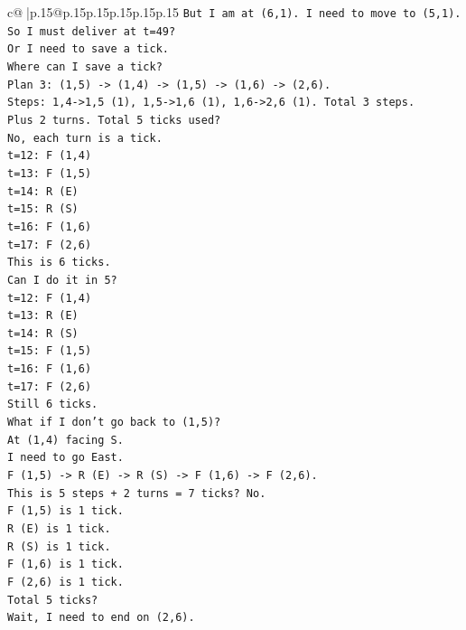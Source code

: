 \documentclass{article}
\begin{document}
{\begin{supertabular}{c@{$\;$}|p{.15\linewidth}@{}p{.15\linewidth}p{.15\linewidth}p{.15\linewidth}p{.15\linewidth}p{.15\linewidth}}
{{{\texttt{But I am at (6,1). I need to move to (5,1).} \\
\texttt{So I must deliver at t=49?} \\
\texttt{Or I need to save a tick.} \\
\texttt{Where can I save a tick?} \\
\texttt{Plan 3: (1,5) {-}> (1,4) {-}> (1,5) {-}> (1,6) {-}> (2,6).} \\
\texttt{Steps: 1,4{-}>1,5 (1), 1,5{-}>1,6 (1), 1,6{-}>2,6 (1). Total 3 steps.} \\
\texttt{Plus 2 turns. Total 5 ticks used?} \\
\texttt{No, each turn is a tick.} \\
\texttt{t=12: F (1,4)} \\
\texttt{t=13: F (1,5)} \\
\texttt{t=14: R (E)} \\
\texttt{t=15: R (S)} \\
\texttt{t=16: F (1,6)} \\
\texttt{t=17: F (2,6)} \\
\texttt{This is 6 ticks.} \\
\texttt{Can I do it in 5?} \\
\texttt{t=12: F (1,4)} \\
\texttt{t=13: R (E)} \\
\texttt{t=14: R (S)} \\
\texttt{t=15: F (1,5)} \\
\texttt{t=16: F (1,6)} \\
\texttt{t=17: F (2,6)} \\
\texttt{Still 6 ticks.} \\
\texttt{What if I don't go back to (1,5)?} \\
\texttt{At (1,4) facing S.} \\
\texttt{I need to go East.} \\
\texttt{F (1,5) {-}> R (E) {-}> R (S) {-}> F (1,6) {-}> F (2,6).} \\
\texttt{This is 5 steps + 2 turns = 7 ticks? No.} \\
\texttt{F (1,5) is 1 tick.} \\
\texttt{R (E) is 1 tick.} \\
\texttt{R (S) is 1 tick.} \\
\texttt{F (1,6) is 1 tick.} \\
\texttt{F (2,6) is 1 tick.} \\
\texttt{Total 5 ticks?} \\
\texttt{Wait, I need to end on (2,6).} \\
}}}
\end{supertabular}}
\end{document}
